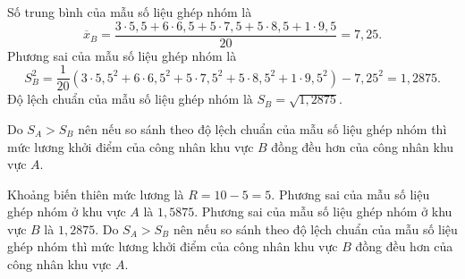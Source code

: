\begin{ex}
{\begin{itemize}
\begin{itemize}
			Số trung bình của mẫu số liệu ghép nhóm là
			$$ \overline{x}_B=\dfrac{3\cdot 5{,}5+6\cdot 6{,}5+5\cdot 7{,}5+5\cdot 8{,}5+1\cdot 9{,}5}{20}=7{,}25. $$
			Phương sai của mẫu số liệu ghép nhóm là
			$$ S_B^2=\dfrac{1}{20}\left( 3\cdot 5{,}5^2+6\cdot 6{,}5^2+5\cdot 7{,}5^2+5\cdot 8{,}5^2+1\cdot 9{,}5^2\right)-7{,}25^2=1{,}2875.  $$
			Độ lệch chuẩn của mẫu số liệu ghép nhóm là $ S_B=\sqrt{1{,}2875} $.
		\end{itemize}
		Do $S_A > S_B$ nên nếu so sánh theo độ lệch chuẩn của mẫu số liệu ghép nhóm thì mức lương khởi điểm của công nhân khu vực $B$ đồng đều hơn của công nhân khu vực $A$.
	\end{itemize}
	\begin{itemchoice}
		\itemch Khoảng biến thiên mức lương là $ R=10-5=5 $.
		\itemch Phương sai của mẫu số liệu ghép nhóm ở khu vực $ A $ là $ 1{,}5875 $.
		\itemch Phương sai của mẫu số liệu ghép nhóm ở khu vực $ B $ là $ 1{,}2875 $.
		\itemch Do $S_A > S_B$ nên nếu so sánh theo độ lệch chuẩn của mẫu số liệu ghép nhóm thì mức lương khởi điểm của công nhân khu vực $B$ đồng đều hơn của công nhân khu vực $A$.
	\end{itemchoice}	
}
\end{ex}

